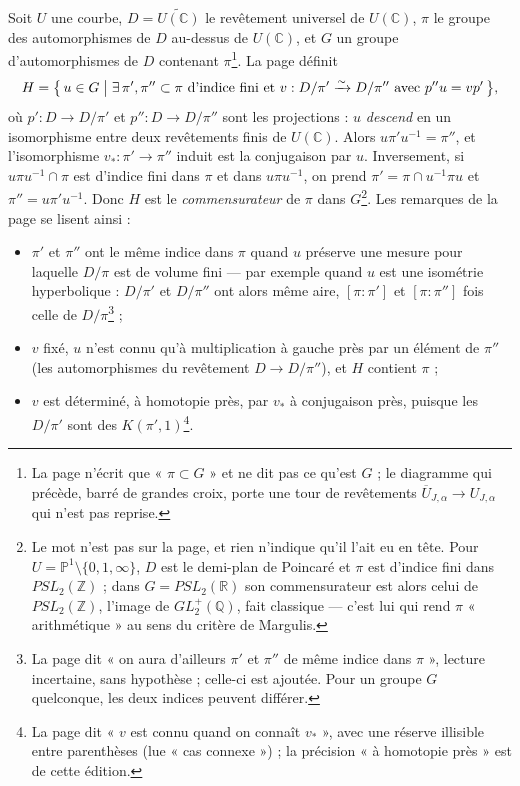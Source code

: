 \documentclass[11pt,a4paper]{article}
\begin{document}
Soit $U$ une courbe, $D = \widetilde{U(\mathbb{C})}$ le revêtement universel de
$U(\mathbb{C})$, $\pi$ le groupe des automorphismes de $D$ au-dessus de
$U(\mathbb{C})$, et $G$ un groupe d'automorphismes de $D$ contenant
$\pi$\footnote{La page n'écrit que « $\pi \subset G$ » et ne dit pas ce qu'est
$G$ ; le diagramme qui précède, barré de grandes croix, porte une tour de
revêtements $\overline{U}_{J,\alpha} \to U_{J,\alpha}$ qui n'est pas reprise.}.
La page définit
\[
H = \bigl\{\, u \in G \bigm| \exists\, \pi', \pi'' \subset \pi \text{ d'indice
fini et } v : D/\pi' \xrightarrow{\sim} D/\pi'' \text{ avec } p'' u = v p'
\,\bigr\},
\]
où $p' : D \to D/\pi'$ et $p'' : D \to D/\pi''$ sont les projections :
$u$ \emph{descend} en un isomorphisme entre deux revêtements finis de
$U(\mathbb{C})$. Alors $u \pi' u^{-1} = \pi''$, et l'isomorphisme $v_* : \pi'
\to \pi''$ induit est la conjugaison par $u$. Inversement, si $u \pi u^{-1}
\cap \pi$ est d'indice fini dans $\pi$ et dans $u\pi u^{-1}$, on prend $\pi' =
\pi \cap u^{-1}\pi u$ et $\pi'' = u\pi' u^{-1}$. Donc $H$ est le
\emph{commensurateur} de $\pi$ dans $G$\footnote{Le mot n'est pas sur la page, et
rien n'indique qu'il l'ait eu en tête. Pour $U = \mathbb{P}^1 \setminus \{0, 1,
\infty\}$, $D$ est le demi-plan de Poincaré et $\pi$ est d'indice fini dans
$PSL_2(\mathbb{Z})$ ; dans $G = PSL_2(\mathbb{R})$ son commensurateur est alors
celui de $PSL_2(\mathbb{Z})$, l'image de $GL_2^{+}(\mathbb{Q})$, fait classique
— c'est lui qui rend $\pi$ « arithmétique » au sens du critère de Margulis.}.
Les remarques de la page se lisent ainsi :

\begin{itemize}
\item $\pi'$ et $\pi''$ ont le même indice dans $\pi$ quand $u$ préserve une
mesure pour laquelle $D/\pi$ est de volume fini — par exemple quand $u$ est
une isométrie hyperbolique : $D/\pi'$ et $D/\pi''$ ont alors même aire,
$[\pi:\pi']$ et $[\pi:\pi'']$ fois celle de $D/\pi$\footnote{La page dit
« on aura d'ailleurs $\pi'$ et $\pi''$ de même indice dans $\pi$ », lecture
incertaine, sans hypothèse ; celle-ci est ajoutée. Pour un groupe $G$
quelconque, les deux indices peuvent différer.} ;
\item $v$ fixé, $u$ n'est connu qu'à multiplication à gauche près par un élément
de $\pi''$ (les automorphismes du revêtement $D \to D/\pi''$), et $H$ contient
$\pi$ ;
\item $v$ est déterminé, à homotopie près, par $v_*$ à conjugaison près,
puisque les $D/\pi'$ sont des $K(\pi', 1)$\footnote{La page dit « $v$ est connu
quand on connaît $v_*$ », avec une réserve illisible entre parenthèses (lue
« cas connexe ») ; la précision « à homotopie près » est de cette édition.}.
\end{itemize}
\end{document}
